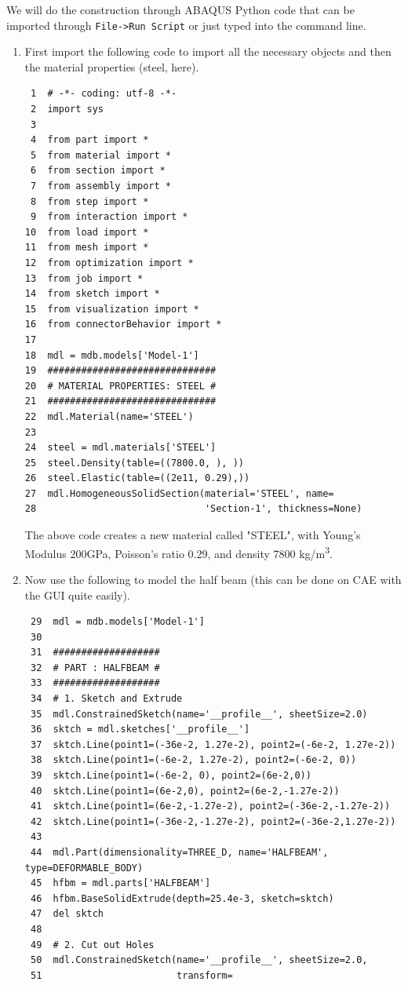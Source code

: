 \documentclass[11pt]{article}
\begin{document}
We will do the construction through ABAQUS Python code that can be imported through \texttt{File->Run Script} or just typed into the command line.

\begin{enumerate}
\item First import the following code to import all the necessary objects and then the material properties (steel, here).
\begin{verbatim}
 1  # -*- coding: utf-8 -*-
 2  import sys
 3  
 4  from part import *
 5  from material import *
 6  from section import *
 7  from assembly import *
 8  from step import *
 9  from interaction import *
10  from load import *
11  from mesh import *
12  from optimization import *
13  from job import *
14  from sketch import *
15  from visualization import *
16  from connectorBehavior import *
17  
18  mdl = mdb.models['Model-1']
19  ##############################
20  # MATERIAL PROPERTIES: STEEL #
21  ##############################
22  mdl.Material(name='STEEL')
23  
24  steel = mdl.materials['STEEL']
25  steel.Density(table=((7800.0, ), ))
26  steel.Elastic(table=((2e11, 0.29),))
27  mdl.HomogeneousSolidSection(material='STEEL', name=
28                              'Section-1', thickness=None)
\end{verbatim}
The above code creates a new material called "STEEL", with Young's Modulus 200GPa, Poisson's ratio 0.29, and density 7800 kg/m\textsuperscript{3}.
\item Now use the following to model the half beam (this can be done on CAE with the GUI quite easily).
\begin{verbatim}
 29  mdl = mdb.models['Model-1']
 30  
 31  ###################
 32  # PART : HALFBEAM #
 33  ###################
 34  # 1. Sketch and Extrude
 35  mdl.ConstrainedSketch(name='__profile__', sheetSize=2.0)
 36  sktch = mdl.sketches['__profile__']
 37  sktch.Line(point1=(-36e-2, 1.27e-2), point2=(-6e-2, 1.27e-2))
 38  sktch.Line(point1=(-6e-2, 1.27e-2), point2=(-6e-2, 0))
 39  sktch.Line(point1=(-6e-2, 0), point2=(6e-2,0))
 40  sktch.Line(point1=(6e-2,0), point2=(6e-2,-1.27e-2))
 41  sktch.Line(point1=(6e-2,-1.27e-2), point2=(-36e-2,-1.27e-2))
 42  sktch.Line(point1=(-36e-2,-1.27e-2), point2=(-36e-2,1.27e-2))
 43  
 44  mdl.Part(dimensionality=THREE_D, name='HALFBEAM', type=DEFORMABLE_BODY)
 45  hfbm = mdl.parts['HALFBEAM']
 46  hfbm.BaseSolidExtrude(depth=25.4e-3, sketch=sktch)
 47  del sktch
 48  
 49  # 2. Cut out Holes
 50  mdl.ConstrainedSketch(name='__profile__', sheetSize=2.0,
 51                        transform=

\end{verbatim}
\end{enumerate}
\end{document}
